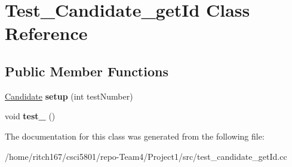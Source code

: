 \hypertarget{classTest__Candidate__getId}{}\section{Test\+\_\+\+Candidate\+\_\+get\+Id Class Reference}
\label{classTest__Candidate__getId}
\subsection*{Public Member Functions}
\begin{DoxyCompactItemize}
\item 
\mbox{\label{classTest__Candidate__getId_aa1d9b96cbc1c8d2cad64ffba0595f17a}} 
\hyperlink{classCandidate}{Candidate} {\bfseries setup} (int test\+Number)
\item 
\mbox{\label{classTest__Candidate__getId_af412987045d2d154857982357ea913e5}} 
void {\bfseries test\+\_} ()
\end{DoxyCompactItemize}


The documentation for this class was generated from the following file\+:\begin{DoxyCompactItemize}
\item 
/home/ritch167/csci5801/repo-\/\+Team4/\+Project1/src/test\+\_\+candidate\+\_\+get\+Id.\+cc\end{DoxyCompactItemize}
